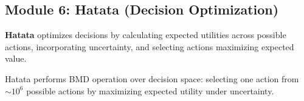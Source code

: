 \subsection{Module 6: Hatata (Decision Optimization)}

\begin{definition}
\textbf{Hatata} optimizes decisions by calculating expected utilities across possible actions, incorporating uncertainty, and selecting actions maximizing expected value.
\end{definition}

\begin{theorem}
Hatata performs BMD operation over decision space: selecting one action from $\sim 10^6$ possible actions by maximizing expected utility under uncertainty.
\end{theorem}

